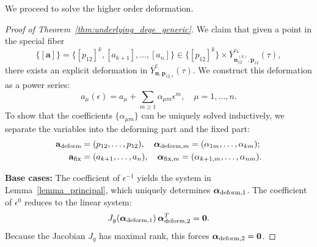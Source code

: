 \documentclass[11pt]{amsart}
\theoremstyle{remark}
\numberwithin{equation}{section}
\begin{document}
We proceed to solve the higher order deformation.
\begin{proof}[Proof of Theorem~\ref{thm:underlying_dege_generic}] 
We claim that given a point in the special fiber
\[
    \{[\mathbf{a}]\} = \{[p_{12}]^k, [a_{k+1}], \dots, [a_n]\} \in \{[p_{12}]^k\} \times \overline{Y}_{\mathbf{n}_{12}^{(k)}, \mathbf{p}_{12}}^{c_k}(\tau),
\]
there exists an explicit deformation in $\overline{Y}_{\mathbf{n},\mathbf{p}_{12,\epsilon}}^c(\tau)$. We construct this deformation as a power series:
\[
    a_\mu(\epsilon) = a_\mu + \sum_{m \geq 1} \alpha_{\mu m}\epsilon^m, \quad \mu=1,\dots,n.
\]
To show that the coefficients $\{ \alpha_{\mu m} \}$ can be uniquely solved inductively, we separate the variables into the deforming part and the fixed part:
\[
\begin{split}
    \mathbf{a}_{\rm deform} &= (p_{12},\dots,p_{12}), \quad \boldsymbol{\alpha}_{{\rm deform},m} = (\alpha_{1m}, \dots,\alpha_{km});
    \\
    \mathbf{a}_{\rm fix} &= (a_{k+1},\dots,a_{n}), \quad \boldsymbol{\alpha}_{{\rm fix},m} = (\alpha_{k+1, m}, \dots, \alpha_{nm}). 
\end{split}
\]

\vspace{0.5em}
\noindent\textbf{Base cases:}
The coefficient of $\epsilon^{-1}$ yields the system in Lemma~\ref{lemma_principal}, which uniquely determines $\boldsymbol{\alpha}_{{\rm deform }, 1}$. 
The coefficient of $\epsilon^0$ reduces to the linear system: 
\[
    J_g( \boldsymbol{\alpha}_{{\rm deform},1} ) \, \boldsymbol{\alpha}_{{\rm deform},2}^T = \mathbf{0}.
\]
Because the Jacobian $J_g$ has maximal rank, this forces $\boldsymbol{\alpha}_{{\rm deform},2} = \mathbf{0}$. 


\end{proof}
\end{document}
